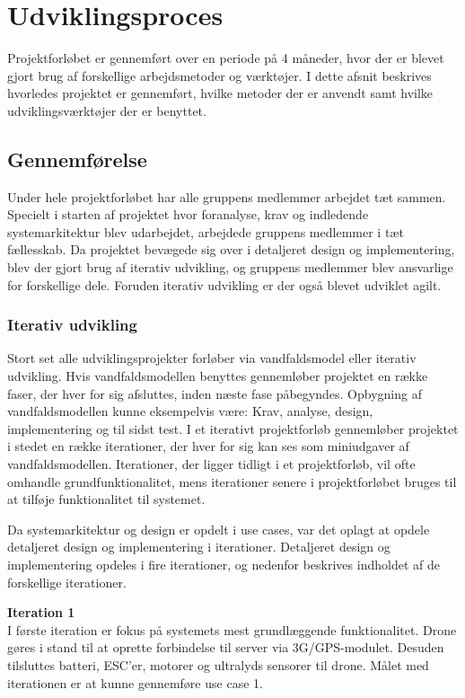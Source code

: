 \section{Udviklingsproces}
Projektforløbet er gennemført over en periode på 4 måneder, hvor der er blevet gjort brug af forskellige arbejdsmetoder og værktøjer. I dette afsnit beskrives hvorledes projektet er gennemført, hvilke metoder der er anvendt samt hvilke udviklingsværktøjer der er benyttet.

\subsection{Gennemførelse}
Under hele projektforløbet har alle gruppens medlemmer arbejdet tæt sammen. Specielt i starten af projektet hvor foranalyse, krav og indledende systemarkitektur blev udarbejdet, arbejdede gruppens medlemmer i tæt fællesskab. 
Da projektet bevægede sig over i detaljeret design og implementering, blev der gjort brug af iterativ udvikling, og gruppens medlemmer blev ansvarlige for forskellige dele. Foruden iterativ udvikling er der også blevet udviklet agilt.


\subsubsection*{Iterativ udvikling}
Stort set alle udviklingsprojekter forløber via vandfaldsmodel eller iterativ udvikling. 
Hvis vandfaldsmodellen benyttes gennemløber projektet en række faser, der hver for sig afsluttes, inden næste fase påbegyndes. Opbygning af vandfaldsmodellen kunne eksempelvis være: Krav, analyse, design, implementering og til sidst test.
I et iterativt projektforløb gennemløber projektet i stedet en række iterationer, der hver for sig kan ses som miniudgaver af vandfaldsmodellen. Iterationer, der ligger tidligt i et projektforløb, vil ofte omhandle grundfunktionalitet, mens iterationer senere i projektforløbet bruges til at tilføje funktionalitet til systemet. 

\newpage 

Da systemarkitektur og design er opdelt i use cases, var det oplagt at opdele detaljeret design og implementering  i iterationer. Detaljeret design og implementering opdeles i fire iterationer, og nedenfor beskrives indholdet af de forskellige iterationer.  

\textbf{Iteration 1}\\
I første iteration er fokus på systemets mest grundlæggende funktionalitet. 
Drone gøres i stand til at oprette forbindelse til server via 3G/GPS-modulet.
Desuden tilsluttes batteri, ESC'er, motorer og ultralyds sensorer til drone. 
Målet med iterationen er at kunne gennemføre use case 1. 

